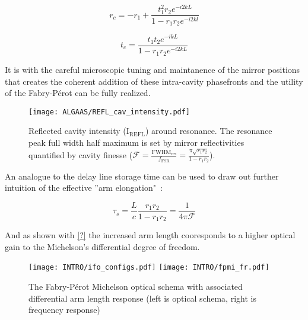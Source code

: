 \iffalse that the input and circulating that the photons belonging to a particular phasefront can be experimentally tracked, and lucky for us this is is why we measure interference at the anti-symmetric port. But these benefit
 with a constant source at the cavity input the phasefronts entering the cavity are superimposed onto the circulating cavity field and, more often than not, add incoherently which can makes this thought experiment seem silly.\fi 

\begin{equation}
	r_c = -r_1 + \frac{t^2_1r_2 e^{-i2kL}}{1-r_1 r_2 e^{-i2kl}}
\end{equation}

\begin{equation}
	t_c = \frac{t_1 t_2 e^{-ikL}}{1-r_1 r_2 e^{-i2kL}}	
\end{equation}

It is with the careful microscopic tuning and maintanence of the mirror positions that creates the coherent addition of these intra-cavity phasefronts and the utility of the Fabry-P\'{e}rot can be fully realized. 

\begin{figure}[H]
\texttt{[image: ALGAAS/REFL\_cav\_intensity.pdf]}
\caption{Reflected cavity intensity (I$_\mathrm{REFL}$) around resonance. The resonance peak full width half maximum is set by mirror reflectivities quantified by cavity finesse ($\mathscr{F} = \frac{\mathrm{FWHM}_\mathrm{res}}{f_\mathrm{FSR}} = \frac{\pi \sqrt{r_1 r_2}}{1-r_1 r_2}$).}
\label{fig:cav_length_response_DCpow}
\end{figure}

An analogue to the delay line storage time can be used to draw out further intuition of the effective ''arm elongation"~\cite{saulson2017}:

\begin{equation}
	\tau_s = \frac{L}{c} \frac{r_1r_2}{1-r_1r_2} = \frac{1}{4 \pi \mathscr{F}}
\end{equation}

And as shown with \ref{?} the increased arm length cooresponds to a higher optical gain to the Michelson's differential degree of freedom. 

\begin{figure}[ht!]
  \begin{subcaptiongroup}{\texttt{[image: INTRO/ifo\_configs.pdf]}}
  \texttt{[image: INTRO/fpmi\_fr.pdf]}
  \end{subcaptiongroup}
  \hfill
  \caption{The Fabry-P\'{e}rot Michelson optical schema with associated differential arm length response (left is optical schema, right is frequency response)}
  \label{fig:fpmi}
\end{figure}

